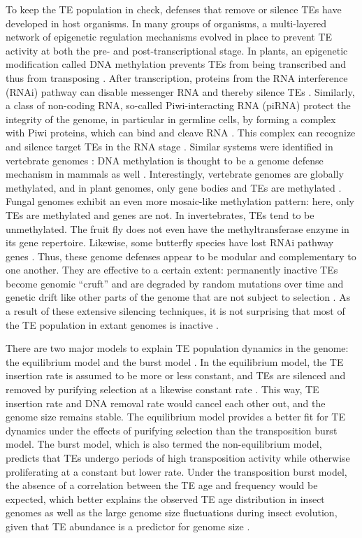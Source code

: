 To keep the TE population in check, defenses that remove or silence TEs
have developed in host organisms.  In many groups of organisms, a
multi-layered network of epigenetic regulation mechanisms evolved in
place to prevent TE activity at both the pre- and post-transcriptional
stage.  In plants, an epigenetic modification called DNA methylation
prevents TEs from being transcribed and thus from transposing
\citep{Slotkin2007, Lisch2009}.  After transcription, proteins from the
RNA interference (RNAi) pathway can disable messenger RNA and thereby
silence TEs \citep{Buchon2006}.  Similarly, a class of non-coding RNA,
so-called Piwi-interacting RNA (piRNA) protect the integrity of the
genome, in particular in germline cells, by forming a complex with Piwi
proteins, which can bind and cleave RNA \citep{Zeng2011}.  This complex
can recognize and silence target TEs in the RNA stage \citep{Siomi2011,
Mondal2018}.  Similar systems were identified in vertebrate genomes
\citep{Suzuki2008, Schubeler2015}: DNA methylation is thought to be a
genome defense mechanism in mammals as well \citep{Yoder1997}.
Interestingly, vertebrate genomes are globally methylated, and in plant
genomes, only gene bodies and TEs are methylated \citep{Suzuki2008}.
Fungal genomes exhibit an even more mosaic-like methylation pattern:
here, only TEs are methylated and genes are not.  In invertebrates, TEs
tend to be unmethylated.  The fruit fly 
does not even have the methyltransferase enzyme in its gene repertoire.
Likewise, some butterfly species have lost RNAi pathway genes
\citep{Pauli2016}.  Thus, these genome defenses appear to be modular and
complementary to one another.  They are effective to a certain extent:
permanently inactive TEs become genomic ``cruft'' and are degraded by
random mutations over time and genetic drift like other parts of the
genome that are not subject to selection \citep{Szitenberg2016}.  As a
result of these extensive silencing techniques, it is not surprising
that most of the TE population in extant genomes is inactive
\citep{Yoder1997, Zilberman2007}.

There are two major models to explain TE population dynamics in the
genome: the equilibrium model and the burst model \citep{Petrov2011,
Kofler2012, Cridland2013, Blumenstiel2014}.  In the equilibrium model,
the TE insertion rate is assumed to be more or less constant, and TEs
are silenced and removed by purifying selection at a likewise constant
rate \citep{Charlesworth1983}.  This way, TE insertion rate and DNA
removal rate would cancel each other out, and the genome size remains
stable.  The equilibrium model provides a better fit for TE dynamics
under the effects of purifying selection \citep{Barron2014} than the
transposition burst model.  The burst model, which is also termed the
non-equilibrium model, predicts that TEs undergo periods of high
transposition activity while otherwise proliferating at a constant but
lower rate.  Under the transposition burst model, the absence of a
correlation between the TE age and frequency would be expected, which
better explains the observed TE age distribution in insect genomes as
well as the large genome size fluctuations during insect evolution,
given that TE abundance is a predictor for genome size
\citep{Alfsnes2017, Petersen2019}.

